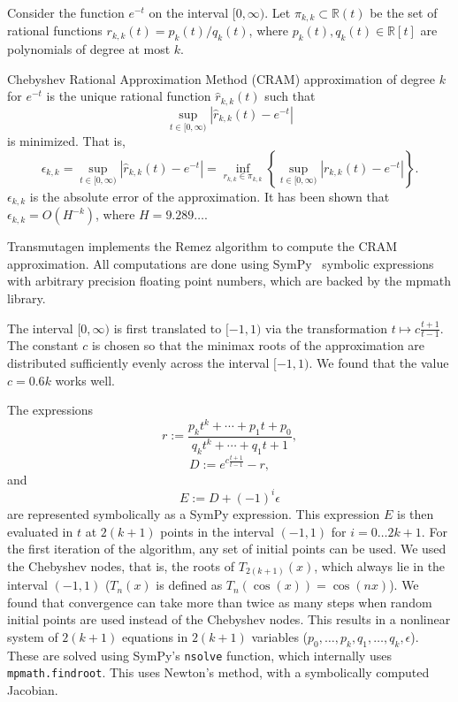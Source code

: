 Consider the function $e^{-t}$ on the interval $[0,\infty)$. Let
$\pi_{k,k}\subset \mathbb{R}(t)$ be the set of rational functions $r_{k,k}(t)
= p_k(t)/q_k(t)$, where $p_k(t), q_k(t)\in \mathbb{R}[t]$ are polynomials of
degree at most $k$.

Chebyshev Rational Approximation Method (CRAM) approximation of degree $k$
for $e^{-t}$ is the unique rational function $\hat{r}_{k,k}(t)$ such that
\begin{equation}
  \sup_{t\in[0, \infty)}|\hat{r}_{k, k}(t) - e^{-t}|
\end{equation}
is minimized. That is,
\begin{equation}
  \epsilon_{k,k} = \sup_{t\in[0, \infty)}|\hat{r}_{k, k}(t) - e^{-t}| = \inf_{r_{k,k}\in\pi_{k,k}}\left\{\sup_{t\in[0, \infty)}|r_{k, k}(t) - e^{-t}|\right\}.
\end{equation}
$\epsilon_{k,k}$ is the absolute error of the approximation. It has been shown
that $\epsilon_{k,k} = O(H^{-k})$, where $H=9.289\ldots$.

Transmutagen implements the Remez algorithm to compute the CRAM approximation.
All computations are done using SymPy~\cite{10.7717/peerj-cs.103} symbolic expressions with arbitrary
precision floating point numbers, which are backed by the mpmath library.

The interval $[0, \infty)$ is first translated to $[-1, 1)$ via the
transformation $t\mapsto c\frac{t+1}{t-1}$.
The constant $c$ is chosen so that the minimax roots of the approximation are
distributed sufficiently evenly across the interval $[-1, 1)$. We found that
the value $c=0.6k$ works well.

The expressions
\begin{equation}
  r := \frac{p_kt^k + \cdots + p_1t + p_0}{q_kt^k + \cdots +
    q_1t + 1},
\end{equation}
\begin{equation}
  D := e^{c\frac{t+1}{t-1}} - r,
\end{equation}
and
\begin{equation}
  E := D + (-1)^i\epsilon
\end{equation}
are represented symbolically as a SymPy expression. This expression $E$ is
then evaluated in $t$ at $2(k + 1)$ points in the interval $(-1, 1)$ for
$i=0\ldots 2k+1$. For the first iteration of the algorithm, any set of initial
points can be used. We used the Chebyshev nodes, that is, the roots of
$T_{2(k +1)}(x)$, which always lie in the interval $(-1, 1)$ ($T_n(x)$ is
defined as $T_n(\cos(x)) = \cos(nx)$). We found that convergence can take more
than twice as many steps when random initial points are used instead of the
Chebyshev nodes. %
This results in a nonlinear system of $2(k+1)$ equations in $2(k+1)$ variables
($p_0,\ldots,p_k,q_1,\ldots,q_k,\epsilon$). These are solved using SymPy's
\texttt{nsolve} function, which internally uses \texttt{mpmath.findroot}. This
uses Newton's method, with a symbolically computed Jacobian.

